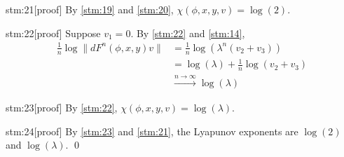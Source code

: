 \begin{stm}{stm:21}[proof]
By \ref{stm:19} and \ref{stm:20}, $\chi(\phi, x, y, v) = \log(2)$.
\end{stm}

\begin{stm}{stm:22}[proof]
Suppose $v_1 = 0$. By \ref{stm:22} and \ref{stm:14},
\begin{align*}
\frac{1}{n} \log \| dF^n(\phi, x, y)v \| 
&= \frac{1}{n} \log (\lambda^n (v_2 + v_3)) \\
&= \log(\lambda) + \frac{1}{n} \log(v_2 + v_3) \\
&\xrightarrow{n \to \infty} \log(\lambda)
\end{align*}
\end{stm}

\begin{stm}{stm:23}[proof]
By \ref{stm:22}, $\chi(\phi, x, y, v) = \log(\lambda)$.
\end{stm}

\begin{stm}{stm:24}[proof]
By \ref{stm:23} and \ref{stm:21}, the Lyapunov exponents are $\log(2)$ and $\log(\lambda)$. \qed
\end{stm}
